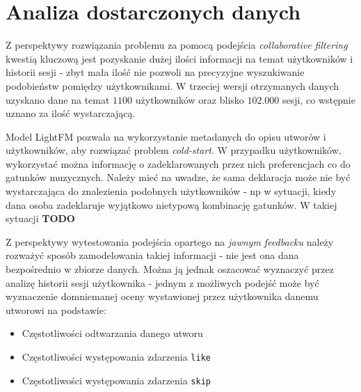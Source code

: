 \documentclass[10pt,a4paper]{article}
\begin{document}
\section{Analiza dostarczonych danych}


Z perspektywy rozwiązania problemu za pomocą podejścia \textit{collaborative filtering} kwestią kluczową jest pozyskanie dużej ilości informacji na temat użytkowników i historii sesji - zbyt mała ilość nie pozwoli na precyzyjne wyszukiwanie podobieństw pomiędzy użytkownikami. W trzeciej wersji otrzymanych danych uzyskano dane na temat $1100$ użytkowników oraz blisko $102.000$ sesji, co wstępnie uznano za ilość wystarczającą.



Model LightFM pozwala na wykorzystanie metadanych do opisu utworów i użytkowników, aby rozwiązać problem \textit{cold-start}. W przypadku użytkowników, wykorzystać można informację o zadeklarowanych przez nich preferencjach co do gatunków muzycznych. Należy mieć na uwadze, że sama deklaracja może nie być wystarczająca do znalezienia podobnych użytkowników - np w sytuacji, kiedy dana osoba zadeklaruje wyjątkowo nietypową kombinację gatunków. W takiej sytuacji \textbf{TODO}

Z perspektywy wytestowania podejścia opartego na \textit{jawnym feedbacku} należy rozważyć sposób zamodelowania takiej informacji - nie jest ona dana bezpośrednio w zbiorze danych. Można ją jednak oszacować wyznaczyć przez analizę historii sesji użytkownika - jednym z możliwych podejść może być wyznaczenie domniemanej oceny wystawionej przez użytkownika danemu utworowi na podstawie:

\begin{itemize}

\item Częstotliwości odtwarzania danego utworu
\item Częstotliwości występowania zdarzenia \texttt{like}
\item Częstotliwości występowania zdarzenia \texttt{skip}

\end{itemize}
\end{document}
